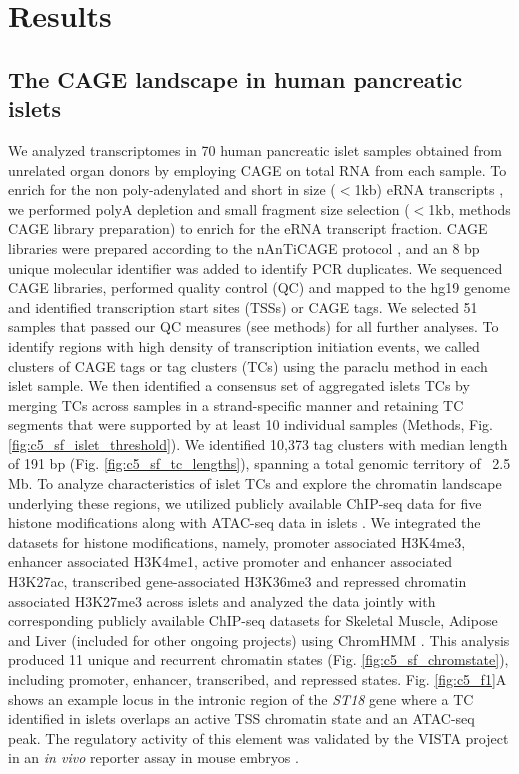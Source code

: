 \section{Results}
\subsection{The CAGE landscape in human pancreatic islets}
We analyzed transcriptomes in 70 human pancreatic islet samples obtained from unrelated organ donors by employing CAGE on total RNA from each sample. To enrich for the non poly-adenylated and short in size ($<$1kb) eRNA transcripts \cite{anderssonAtlasActiveEnhancers2014}, we performed polyA depletion and small fragment size selection ($<$1kb, methods CAGE library preparation) to enrich for the eRNA transcript fraction. CAGE libraries were prepared according to the \ac{nAnTiCAGE} protocol \cite{murataDetectingExpressedGenes2014}, and an 8 bp unique molecular identifier was added to identify PCR duplicates. We sequenced CAGE libraries, performed quality control (QC) and mapped to the hg19 genome and identified transcription start sites (TSSs) or CAGE tags. We selected 51 samples that passed our QC measures (see methods) for all further analyses. To identify regions with high density of transcription initiation events, we called clusters of CAGE tags or tag clusters (TCs) using the paraclu \cite{frithCodeTranscriptionInitiation2008} method in each islet sample. We then identified a consensus set of aggregated islets TCs by merging TCs across samples in a strand-specific manner and retaining TC segments that were supported by at least 10 individual samples (Methods, Fig. \ref{fig:c5_sf_islet_threshold}). We identified 10,373 tag clusters with median length of 191 bp (Fig. \ref{fig:c5_sf_tc_lengths}), spanning a total genomic territory of ~2.5 Mb. To analyze characteristics of islet TCs and explore the chromatin landscape underlying these regions, we utilized publicly available ChIP-seq data for five histone modifications along with ATAC-seq data in islets \cite{varshneyGeneticRegulatorySignatures2017}. We integrated the datasets for histone modifications, namely, promoter associated H3K4me3, enhancer associated H3K4me1, active promoter and enhancer associated H3K27ac, transcribed gene-associated H3K36me3 and repressed chromatin associated H3K27me3 across islets and analyzed the data jointly with corresponding publicly available ChIP-seq datasets for Skeletal Muscle, Adipose and Liver (included for other ongoing projects) using ChromHMM \cite{ernstDiscoveryCharacterizationChromatin2010, ernstMappingAnalysisChromatin2011, ernstChromHMMAutomatingChromatin2012}. This analysis produced 11 unique and recurrent chromatin states (Fig. \ref{fig:c5_sf_chromstate}), including promoter, enhancer, transcribed, and repressed states. Fig. \ref{fig:c5_f1}A shows an example locus in the intronic region of the \textit{ST18} gene where a TC identified in islets overlaps an active TSS chromatin state and an ATAC-seq peak. The regulatory activity of this element was validated by the VISTA project in an \textit{in vivo} reporter assay in mouse embryos \cite{viselVISTAEnhancerBrowser2007}. 


